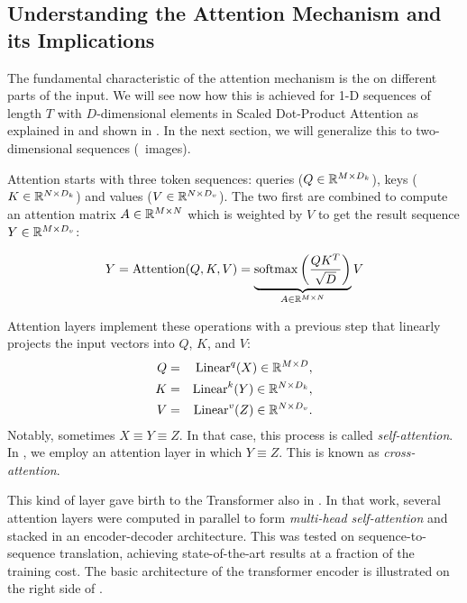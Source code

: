 \subsection{Understanding the Attention Mechanism and its Implications}
The fundamental characteristic of the attention mechanism is the  on different parts of the input. We will see now how this is achieved for 1-D sequences of length $T$ with $D$-dimensional elements in Scaled Dot-Product Attention as explained in  and shown in . In the next section, we will generalize this to two-dimensional sequences (\ie~images).

Attention starts with three token sequences: queries ($Q\in \mathbb{R}^{M\times D_k}$), keys ($K\in \mathbb{R}^{N\times D_k}$) and values ($V\in \mathbb{R}^{N\times D_v}$). The two first are combined to compute an attention matrix $A\in \mathbb{R}^{M\times N}$ which is weighted by $V$ to get the result sequence $Y\in \mathbb{R}^{M\times D_v}$:

\begin{equation}
    Y = \text{Attention}(Q, K, V) = \underbrace{\operatorname{softmax}\left(\dfrac{QK^T}{\sqrt{D}}\right)}_{A \in \mathbb{R}^{M\times N}}V
\end{equation}


Attention layers implement these operations with a previous step that linearly projects the input vectors into $Q$, $K$, and $V$:
\begin{eqnarray*}
    Q & = & \operatorname{Linear}^q(X) \in \mathbb{R}^{M\times D}, \\
    K & = & \operatorname{Linear}^k(Y) \in \mathbb{R}^{N\times D_k}, \\
    V & = & \operatorname{Linear}^v(Z) \in \mathbb{R}^{N\times D_v}.
\end{eqnarray*}
Notably, sometimes $X\equiv Y\equiv Z$. In that case, this process is called \textit{self-attention}. In , we employ an attention layer in which $Y\equiv Z$. This is known as \textit{cross-attention}.

This kind of layer gave birth to the Transformer also in . In that work, several attention layers were computed in parallel to form \textit{multi-head self-attention} and stacked in an encoder-decoder architecture. This was tested on sequence-to-sequence translation, achieving state-of-the-art results at a fraction of the training cost. The basic architecture of the transformer encoder is illustrated on the right side of .

